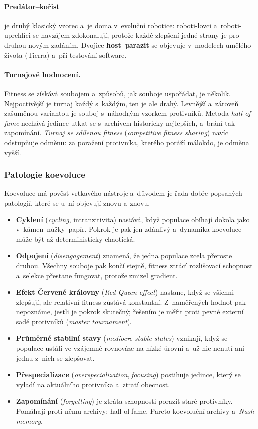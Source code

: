\documentclass[11pt,a4paper]{article}
\theoremstyle{definition}
\begin{document}
\paragraph{Predátor--kořist} je druhý klasický vzorec a~je doma v~evoluční robotice:
roboti-lovci a~roboti-uprchlíci se navzájem zdokonalují, protože každé zlepšení jedné strany
je pro druhou novým zadáním. Dvojice \textbf{host--parazit} se objevuje v~modelech umělého
života (Tierra) a~při testování software.

\paragraph{Turnajové hodnocení.} Fitness se získává soubojem a~způsobů, jak souboje
uspořádat, je několik. Nejpoctivější je turnaj každý s~každým, ten je ale drahý. Levnější
a~zároveň zašuměnou variantou je souboj s~náhodným vzorkem protivníků. Metoda \emph{hall of
fame} nechává jedince utkat se s~archivem historicky nejlepších, a~brání tak zapomínání.
\emph{Turnaj se sdílenou fitness} (\emph{competitive fitness sharing}) navíc odstupňuje
odměnu: za poražení protivníka, kterého poráží málokdo, je odměna vyšší.

\subsubsection{Patologie koevoluce}

Koevoluce má pověst vrtkavého nástroje a~důvodem je řada dobře popsaných patologií, které
se u~ní objevují znovu a~znovu.

\begin{itemize}
\item \textbf{Cyklení} (\emph{cycling}, intranzitivita) nastává, když populace obíhají
  dokola jako v~kámen--nůžky--papír. Pokrok je pak jen zdánlivý a~dynamika koevoluce může
  být až deterministicky chaotická.
\item \textbf{Odpojení} (\emph{disengagement}) znamená, že jedna populace zcela přeroste
  druhou. Všechny souboje pak končí stejně, fitness ztrácí rozlišovací schopnost a~selekce
  přestane fungovat, protože zmizel gradient.
\item \textbf{Efekt Červené královny} (\emph{Red Queen effect}) nastane, když se všichni
  zlepšují, ale relativní fitness zůstává konstantní. Z~naměřených hodnot pak nepoznáme,
  jestli je pokrok skutečný; řešením je měřit proti pevné externí sadě protivníků
  (\emph{master tournament}).
\item \textbf{Průměrné stabilní stavy} (\emph{mediocre stable states}) vznikají, když se
  populace ustálí ve vzájemné rovnováze na nízké úrovni a~už nic nenutí ani jednu z~nich
  se zlepšovat.
\item \textbf{Přespecializace} (\emph{overspecialization}, \emph{focusing}) postihuje
  jedince, který se vyladí na aktuálního protivníka a~ztratí obecnost.
\item \textbf{Zapomínání} (\emph{forgetting}) je ztráta schopnosti porazit staré protivníky.
  Pomáhají proti němu archivy: hall of fame, Pareto-koevoluční archivy a~\emph{Nash memory}.
\end{itemize}
\end{document}
